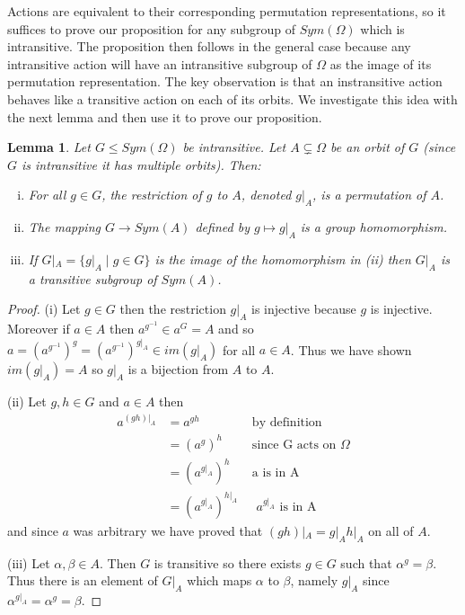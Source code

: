 \documentclass[]{article}
\newtheorem{lem}[thm]{Lemma}
\theoremstyle{definition}
\begin{document}
Actions are equivalent to their corresponding permutation representations, so it suffices to prove our proposition for any subgroup of $Sym(\Omega)$ which is intransitive. The proposition then follows in the general case because any intransitive action will have an intransitive subgroup of $\Omega$ as the image of its permutation representation. The key observation is that an instransitive action behaves like a transitive action on each of its orbits. We investigate this idea with the next lemma and then use it to prove our proposition.

\begin{lem} \label{lem:intransitive}
Let $G \leqslant Sym(\Omega)$ be intransitive. Let $A \subsetneq \Omega$ be an orbit of $G$ (since $G$ is intransitive it has multiple orbits). Then:
\begin{enumerate}[(i)]
	\item For all $g \in G$, the restriction of $g$ to $A$, denoted $g|_A$, is a permutation of $A$.
\vspace{-0.2cm}	\item The mapping $G \rightarrow Sym(A)$ defined by $g \mapsto g|_A$ is a group homomorphism.
\vspace{-0.5cm} \item If $G|_A = \{g|_A \; | \; g \in G \}$ is the image of the homomorphism in (ii) then $G|_A$ is a transitive subgroup of $Sym(A)$.
\end{enumerate}
\end{lem}

\begin{proof} 	
(i) Let $g \in G$ then the restriction $g|_A$ is injective because $g$ is injective. Moreover if $a \in A$ then $a^{g^{-1}} \in a^G = A$ and so $a= (a^{g^{-1}})^g = (a^{g^{-1}})^{g|_A} \in im(g|_A)$ for all $a \in A$. Thus we have shown $im(g|_A)=A$ so $g|_A$ is a bijection from $A$ to $A$.

(ii) Let $g,h \in G$ and $a \in A$ then
\begin{align*}
	a^{(gh)|_A} & = a^{gh} & \mbox{ by definition} \\
	& = (a^g)^h & \mbox{ since G acts on } \Omega \\
	& = (a^{g|_A})^h & \mbox{ a is in A} \\ 
	& = (a^{g|_A})^{h|_A} & \mbox{ } a^{g|_A} \mbox{ is in A}
\end{align*}
and since $a$ was arbitrary we have proved that $(gh)|_A = g|_Ah|_A$ on all of $A$.

(iii) Let $\alpha, \beta \in A$. Then $G$ is transitive so there exists $g \in G$ such that $\alpha^g = \beta$. Thus there is an element of $G|_A$ which maps $\alpha$ to $\beta$, namely $g|_A$ since $\alpha^{g|_A}=\alpha^g=\beta$. 
\end{proof}
\end{document}
